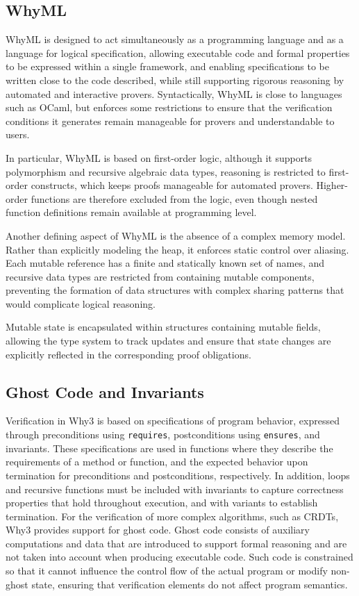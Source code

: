 \subsection{WhyML}
\label{sub:whyml}

WhyML is designed to act simultaneously as a programming language and as a language for logical specification, allowing executable code and formal properties to be expressed within a single framework, and enabling specifications to be written close to the code described, while still supporting rigorous reasoning by automated and interactive provers. Syntactically, WhyML is close to languages such as OCaml, but enforces some restrictions to ensure that the verification conditions it generates remain manageable for provers and understandable to users.

In particular, WhyML is based on first-order logic, although it supports polymorphism and recursive algebraic data types, reasoning is restricted to first-order constructs, which keeps proofs manageable for automated provers. Higher-order functions are therefore excluded from the logic, even though nested function definitions remain available at programming level.

Another defining aspect of WhyML is the absence of a complex memory model. Rather than explicitly modeling the heap, it enforces static control over aliasing. Each mutable reference has a finite and statically known set of names, and recursive data types are restricted from containing mutable components, preventing the formation of data structures with complex sharing patterns that would complicate logical reasoning.

Mutable state is encapsulated within structures containing mutable fields, allowing the type system to track updates and ensure that state changes are explicitly reflected in the corresponding proof obligations.

\subsection{Ghost Code and Invariants}
\label{sub:ghost}

Verification in Why3 is based on specifications of program behavior, expressed through preconditions using \texttt{requires}, postconditions using \texttt{ensures}, and invariants. These specifications are used in functions where they describe the requirements of a method or function, and the expected behavior upon termination for preconditions and postconditions, respectively. In addition, loops and recursive functions must be included with invariants to capture correctness properties that hold throughout execution, and with variants to establish termination. For the verification of more complex algorithms, such as CRDTs, Why3 provides support for ghost code. Ghost code consists of auxiliary computations and data that are introduced to support formal reasoning and are not taken into account when producing executable code. Such code is constrained so that it cannot influence the control flow of the actual program or modify non-ghost state, ensuring that verification elements do not affect program semantics.


